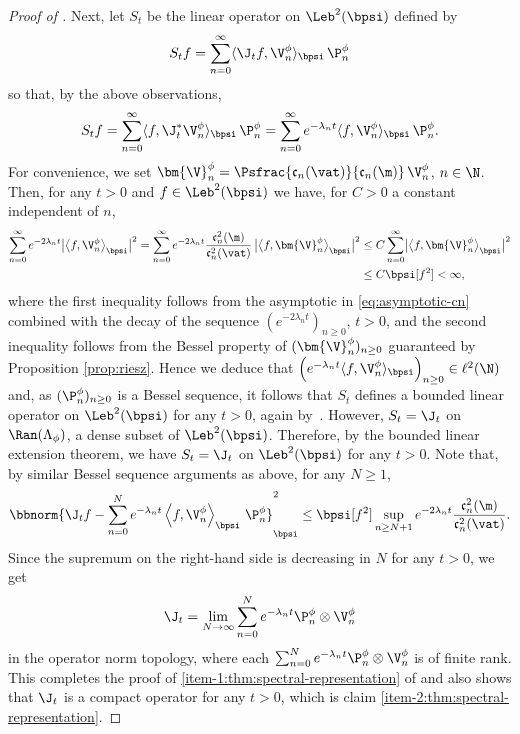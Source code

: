 \begin{proof}[Proof of ]
Next, let $S_t$ be the linear operator on $\Leb^2(\bpsi)$ defined by
\begin{equation*}
S_t f = \sum_{n=0}^\infty \langle \J_t f, \V_n^\phi \rangle_{\bpsi}\, \P_n^\phi
\end{equation*}
so that, by the above observations,
\begin{equation*}
S_t f = \sum_{n=0}^\infty \langle f, \J_t^* \V_n^\phi \rangle_{\bpsi}\, \P_n^\phi = \sum_{n=0}^\infty e^{-\lambda_n t} \langle f, \V_n^\phi \rangle_{\bpsi}\, \P_n^\phi.
\end{equation*}
For convenience, we set ${\bm{\V}}_n^\phi = \Psfrac{\mathfrak{c}_n(\vat)}{\mathfrak{c}_n(\m)}\, \V_n^\phi$, $n \in \N$. Then, for any $t > 0$ and $f \in \Leb^2(\bpsi)$ we have, for $C >0$ a constant independent of $n$,
\begin{align*}
\sum_{n=0}^\infty e^{-2\lambda_n t} \bigl|\bigl\langle f, \V_n^\phi \bigr\rangle_{\bpsi}\bigr|^2 = \sum_{n=0}^\infty e^{-2 \lambda_n t} \frac{\mathfrak{c}_n^2(\m)}{\mathfrak{c}_n^2(\vat)}\, \bigl|\bigl\langle f, {\bm{\V}}_n^\phi\bigr\rangle_{\bpsi}\bigr|^2 &\leq C \sum_{n=0}^\infty \bigl|\bigl\langle f, {\bm{\V}}_n^\phi \bigr\rangle_{\bpsi}\bigr|^2\\
&\leq C \bpsi [f^2] < \infty,
\end{align*}
where the first inequality follows from the asymptotic in \eqref{eq:asymptotic-cn} combined with the decay of the sequence $(e^{-2\lambda_n t})_{n \geq 0}$, $t > 0$, and the second inequality follows from the Bessel property of $({\bm{\V}}_n^\phi )_{n \geq 0}$ guaranteed by Proposition \ref{prop:riesz}. Hence we deduce that $\left(e^{-\lambda_n t} \langle f, \V_n^\phi \rangle_{\bpsi}\right)_{n \geq 0} \in \ell^2(\N)$ and, as $(\P_n^\phi)_{n \geq 0}$ is a Bessel sequence, it follows that $S_t$ defines a bounded linear operator on $\Leb^2(\bpsi)$ for any $t > 0$, again by~\cite[Th.\,3.1.3]{Christensen2003a}. However, $S_t = \J_t$ on $\Ran(\Lambda_\phi)$, a dense subset of $\Leb^2(\bpsi)$. Therefore, by the bounded linear extension theorem, we have $S_t = \J_t$ on $\Leb^2(\bpsi)$ for any $t > 0$. Note that, by similar Bessel sequence arguments as above, for any $N \geq 1$,
\begin{equation*}
\bbnorm{\J_tf -\sum_{n=0}^N e^{-\lambda_n t} \left\langle f, \V_n^\phi \right\rangle_{\bpsi}\, \P_n^\phi}_\bpsi^2 \leq \bpsi [f^2] \sup_{n \geq N+1} e^{-2 \lambda_n t} \frac{\mathfrak{c}_n^2(\m)}{\mathfrak{c}_n^2(\vat)}.
\end{equation*}
Since the supremum on the right-hand side is decreasing in $N$ for any $t > 0$, we get
\begin{equation*}
\J_t = \lim_{N \to \infty} \sum_{n=0}^N e^{-\lambda_n t} \P_n^\phi \otimes \V_n^\phi
\end{equation*}
in the operator norm topology, where each $\sum_{n=0}^N e^{-\lambda_n t} \P_n^\phi \otimes \V_n^\phi$ is of finite rank. This completes the proof of \eqref{item-1:thm:spectral-representation} of  and also shows that $\J_t$ is a compact operator for any $t > 0$, which is claim \eqref{item-2:thm:spectral-representation}.


\end{proof}
